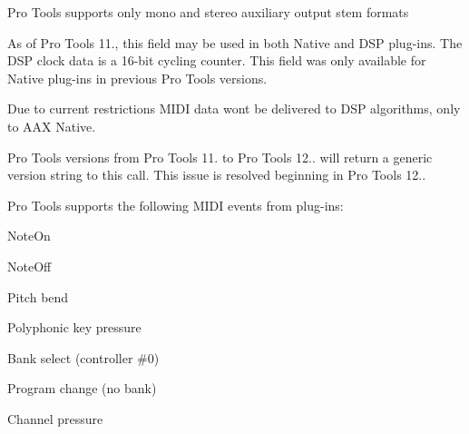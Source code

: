 \begin{DoxyRefList}
\label{a00801__compatibility_notes000058}%
%
 Pro Tools supports only mono and stereo auxiliary output stem formats 
\item[Member \mbox{\hyperlink{a02069_a59727dee1043fcd7f14da130ab254445}{AAX\+\_\+\+IComponent\+Descriptor\+::Add\+Clock}} (AAX\+\_\+\+CField\+Index in\+Field\+Index)=0]\label{a00801__compatibility_notes000056}%
%
 As of Pro Tools 11., this field may be used in both Native and DSP plug-\/ins. The DSP clock data is a 16-\/bit cycling counter. This field was only available for Native plug-\/ins in previous Pro Tools versions. 
\item[Member \mbox{\hyperlink{a02069_a6284dda9ccca898e33075de29dad4e39}{AAX\+\_\+\+IComponent\+Descriptor\+::Add\+MIDINode}} (AAX\+\_\+\+CField\+Index in\+Field\+Index, AAX\+\_\+\+EMIDINode\+Type in\+Node\+Type, const char in\+Node\+Name\mbox{[}\mbox{]}, uint32\+\_\+t channel\+Mask)=0]\label{a00801__compatibility_notes000059}%
%
 Due to current restrictions MIDI data won\textquotesingle{}t be delivered to DSP algorithms, only to AAX Native. 
\item[Member \mbox{\hyperlink{a02077_ad2a002a133491b2ed572054588641e78}{AAX\+\_\+\+IController\+::Get\+Host\+Name}} (\mbox{\hyperlink{a02161}{AAX\+\_\+\+IString}} $\ast$out\+Host\+Name\+String) const =0]\label{a00801__compatibility_notes000060}%
%
 Pro Tools versions from Pro Tools 11. to Pro Tools 12.. will return a generic version string to this call. This issue is resolved beginning in Pro Tools 12.. 
\item[Member \mbox{\hyperlink{a02133_a5e1c5409158164f57376f908c9693a8b}{AAX\+\_\+\+IMIDINode\+::Post\+MIDIPacket}} (\mbox{\hyperlink{a01709}{AAX\+\_\+\+CMidi\+Packet}} $\ast$packet)=0]\label{a00801__compatibility_notes000061}%
%
 Pro Tools supports the following MIDI events from plug-\/ins\+:
\begin{DoxyItemize}
\item Note\+On
\item Note\+Off
\item Pitch bend
\item Polyphonic key pressure
\item Bank select (controller \#0)
\item Program change (no bank)
\item Channel pressure 

\end{DoxyItemize}
\end{DoxyRefList}
